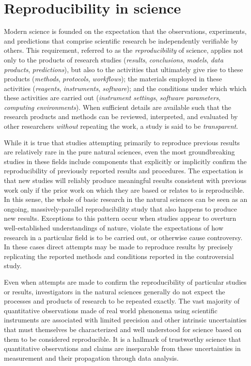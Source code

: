 \section{Reproducibility in science}

Modern science is founded on the expectation that the observations, experiments, and
	predictions that comprise scientific research be independently verifiable by others.
This requirement, referred to as the \emph{reproducibility} of 
	science, applies not only to the products of research studies (\emph{results}, 
	\emph{conclusions}, \emph{models}, \emph{data products}, \emph{predictions}), but also to the 
	activities that ultimately give rise to these products (\emph{methods}, 
	\emph{protocols}, \emph{workflows}); the materials employed in these 
 	activities (\emph{reagents}, \emph{instruments}, \emph{software}); and the conditions 
	under which which these activities are carried out (\emph{instrument settings}, 
	\emph{software parameters},
	\emph{computing environments}).  When sufficient details are available
	such that the research products and methods can be reviewed, interpreted, and
	evaluated by other researchers \emph{without} repeating the work, a study is said to be 
	\emph{transparent}.

While it is true that studies attempting primarily to reproduce previous results are relatively rare in the
	pure natural sciences, even the most groundbreaking studies in these fields include components	
	that explicitly or implicitly confirm the reproducibility of previously reported results and procedures.
The expectation is that new studies will reliably produce meaningful results consistent with previous work 
	only if the prior work on which they are based or relates to is reproducible.
In this sense, the whole of basic research in the natural sciences can be seen as an ongoing, massively-parallel
	reproducibility study that also happens to produce new results.
Exceptions to this pattern occur when studies appear to overturn well-established understandings of nature,
	violate the expectations of how research in a particular field is to be carried out, or otherwise cause controversy.
In these cases direct attempts may be made to reproduce results by precisely replicating the reported methods
	and conditions reported in the controversial study.

Even when attempts are made to confirm the reproducibility of particular studies or results, investigators in
	the natural sciences generally do not expect the processes and products of research to be repeated exactly.
The vast majority of quantitative observations made of real world phenonema using scientific instruments
	are associated with limited precision and other intrinsic uncertainties that must themselves be characterized
	and well understood for science based on them to be considered reproducible.
It is a hallmark of trustworthy science that quantitative observations and claims are inseparable from these 
	uncertainties in measurement and their propagation through data analysis.

